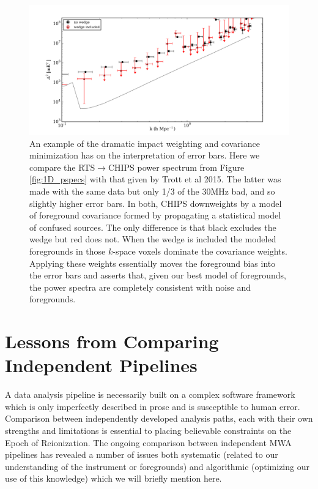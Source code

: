 \documentclass[twolcolumn,iop]{emulateapj}
\def\chipscite{Trott et al 2015}
\begin{document}
\begin{figure}[htbp]
\begin{center}
\includegraphics[width=\textwidth]{figures/MWA_PS_Compare/MWAPipeline_compare_1d_radial_chips_pub.png}
\caption{An example of the dramatic impact weighting and covariance minimization has on the interpretation of error bars.  Here we compare the RTS$\to$CHIPS power spectrum from Figure \ref{fig:1D_pspecs} with that given by \chipscite{}. The latter was made with the same data but only 1/3 of the 30MHz bad, and so slightly higher error bars.  In both, CHIPS downweights by a model of foreground covariance formed by propagating a statistical model of confused sources. The only difference is that black excludes the wedge but red does not. When the wedge is included the modeled foregrounds in those $k$-space voxels dominate the covariance weights. Applying these weights essentially moves the foreground bias into the error bars and asserts that, given our best model of foregrounds, the power spectra are completely consistent with noise and  foregrounds.}
\label{fig:CHIPS_compare}
\end{center}
\end{figure}

\section{Lessons from Comparing Independent Pipelines}
\label{sec:lessons}
          A data analysis pipeline is necessarily built on a complex software framework which is only imperfectly described in prose and is susceptible to human error.  Comparison between independently developed analysis paths, each with their own strengths and limitations is essential to placing believable constraints on the Epoch of Reionization. The ongoing comparison between independent MWA pipelines has revealed a number of issues both systematic (related to our understanding of the instrument or foregrounds) and algorithmic (optimizing our use of this knowledge) which we will briefly mention here.
      
\end{document}

